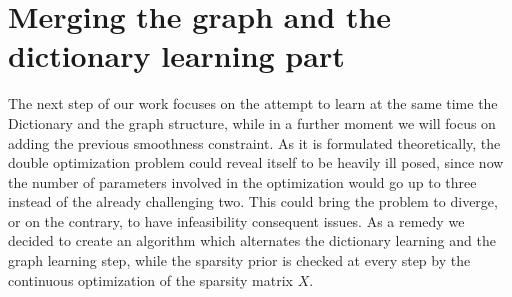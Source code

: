 \chapter{Merging the graph and the dictionary learning part}
\label{sec:GD}
The next step of our work focuses on the attempt to learn at the same time the Dictionary and the graph structure, while in a further moment we will focus on adding the previous smoothness constraint. As it is formulated theoretically, the double optimization problem could reveal itself to be heavily ill posed, since now the number of parameters involved in the optimization would go up to three instead of the already challenging two. This could bring the problem to diverge, or on the contrary, to have infeasibility consequent issues. As a remedy we decided to create an algorithm which alternates the dictionary learning and the graph learning step, while the sparsity prior is checked at every step by the continuous optimization of the sparsity matrix $X$.

